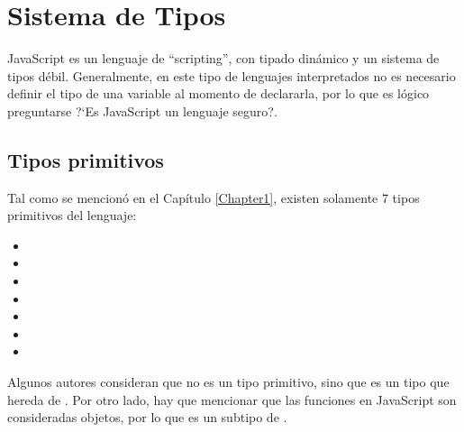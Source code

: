 
\chapter{Sistema de Tipos} %

\label{Chapter2} %


JavaScript es un lenguaje de "`scripting"', con tipado dinámico y un sistema de tipos débil. Generalmente, en este tipo de lenguajes interpretados no es necesario definir el tipo de una variable al momento de declararla, por lo que es lógico preguntarse ?`Es JavaScript un lenguaje seguro?.


\section{Tipos primitivos}

Tal como se mencionó en el Capítulo \ref{Chapter1}, existen solamente 7 tipos primitivos del lenguaje:

\begin{itemize}
\item {}
\item {}
\item {}
\item {}
\item {}
\item {}
\item {}
\end{itemize}

Algunos autores consideran que  no es un tipo primitivo, sino que es un tipo que hereda de . Por otro lado, hay que mencionar que las funciones en JavaScript son consideradas objetos, por lo que  es un subtipo de .

